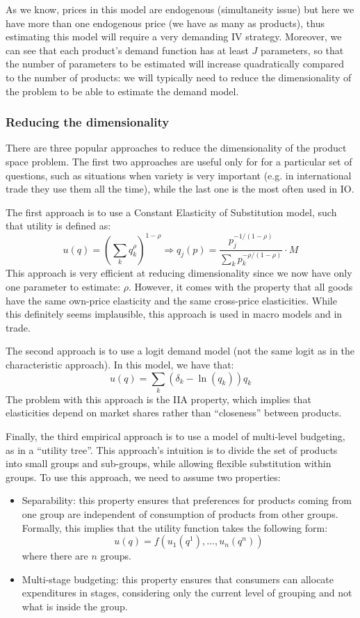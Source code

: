As we know, prices in this model are endogenous (simultaneity issue) but here we have more than one endogenous price (we have as many as products), thus estimating this model will require a very demanding IV strategy. Moreover, we can see that each product's demand function has at least $J$ parameters, so that the number of parameters to be estimated will increase quadratically compared to the number of products: we will typically need to reduce the dimensionality of the problem to be able to estimate the demand model.

\subsubsection{Reducing the dimensionality}

There are three popular approaches to reduce the dimensionality of the product space problem. The first two approaches are useful only for for a particular set of questions, such as situations when variety is very important (e.g. in international trade they use them all the time), while the last one is the most often used in IO.

The first approach is to use a Constant Elasticity of Substitution model, such that utility is defined as: $$ u(q) = \left(\sum_k q_k^\rho\right)^{1-\rho} \Rightarrow q_j(p) = \frac{p_j^{-1/(1-\rho)}}{\sum_k p_k^{-\rho/(1-\rho)}} \cdot M $$
This approach is very efficient at reducing dimensionality since we now have only one parameter to estimate: $\rho$. However, it comes with the property that all goods have the same own-price elasticity and the same cross-price elasticities. While this definitely seems implausible, this approach is used in macro models and in trade.

The second approach is to use a logit demand model (not the same logit as in the characteristic approach). In this model, we have that: $$ u(q) = \sum_k (\delta_k - \ln(q_k))q_k $$ The problem with this approach is the IIA property, which implies that elasticities depend on market shares rather than ``closeness'' between products.

Finally, the third empirical approach is to use a model of multi-level budgeting, as in a ``utility tree''. This approach's intuition is to divide the set of products into small groups and sub-groups, while allowing flexible substitution within groups. To use this approach, we need to assume two properties:\begin{itemize}
\item Separability: this property ensures that preferences for products coming from one group are independent of consumption of products from other groups. Formally, this implies that the utility function takes the following form: $$ u(q) = f(u_1(q^1), ..., u_n(q^n)) $$ where there are $n$ groups.
\item Multi-stage budgeting: this property ensures that consumers can allocate expenditures in stages, considering only the current level of grouping and not what is inside the group.
\end{itemize}

